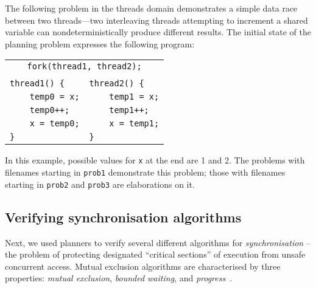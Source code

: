 The following problem in the threads domain demonstrates a simple data race between two threads---two interleaving threads attempting to increment a shared variable can nondeterministically produce different results. The initial state of the planning problem expresses the following program:
%
	\begin{center} \small
	\begin{tabular}{ll}
	\multicolumn{2}{c}{\texttt{fork(thread1, thread2);}} \\
	& \\
	\texttt{thread1() \{} & \texttt{thread2() \{} \\
	\texttt{~~~~temp0 = x;\qquad} & \texttt{~~~~temp1 = x;} \\
	\texttt{~~~~temp0++;} & \texttt{~~~~temp1++;} \\
	\texttt{~~~~x = temp0;} & \texttt{~~~~x = temp1;} \\
	\texttt{\}} & \texttt{\}} \\
	\end{tabular}
	\end{center}
%
In this example, possible values for \texttt{x} at the end are 1 and 2. The problems with filenames starting in \texttt{prob1} demonstrate this problem; those with filenames starting in \texttt{prob2} and \texttt{prob3} are elaborations on it.

\subsection{Verifying synchronisation algorithms}

Next, we used planners to verify several different algorithms for {\em synchronisation} -- the problem of protecting designated ``critical sections'' of execution from unsafe concurrent access. Mutual exclusion algorithms are characterised by three properties: {\em mutual exclusion}, {\em bounded waiting}, and {\em progress}~\cite{de0u}.

